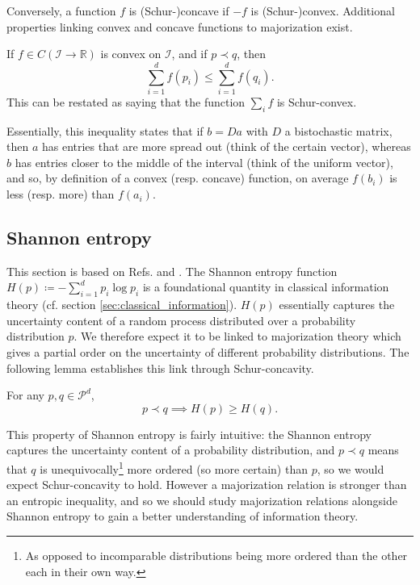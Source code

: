 Conversely, a function $f$ is (Schur-)concave if $-f$ is (Schur-)convex. Additional properties linking convex and concave functions to majorization exist.

\begin{lemma} \label{lem:karamata}
    If $f \in C(\mathcal{I} \to \mathbb{R})$ is convex on $\mathcal{I}$, and if $p \prec q$, then
    \begin{equation}
        \sum_{i=1}^{d} f(p_i) \leq \sum_{i=1}^{d} f(q_i).
    \end{equation}
    This can be restated as saying that the function $\sum_i f$ is Schur-convex.
\end{lemma}

Essentially, this inequality states that if $b = Da$ with $D$ a bistochastic matrix, then $a$ has entries that are more spread out (think of the certain vector), whereas $b$ has entries closer to the middle of the interval (think of the uniform vector), and so, by definition of a convex (resp. concave) function, on average $f(b_i)$ is less (resp. more) than $f(a_i)$.



\subsection{Shannon entropy} \label{sec:schur_shannon}

This section is based on Refs. \cite[p. 101]{marshall_inequalities_2011} and \cite[p. 88]{cover_elements_2006}. %
The Shannon entropy function $H(p) \coloneqq - \sum_{i = 1}^{d} p_i \log p_i$ is a foundational quantity in classical information theory (cf. section \ref{sec:classical_information}). $H(p)$ essentially captures the uncertainty content of a random process distributed over a probability distribution $p$. We therefore expect it to be linked to majorization theory which gives a partial order on the uncertainty of different probability distributions. The following lemma establishes this link through Schur-concavity.

\begin{lemma}
    For any $p, q \in \mathcal{P}^d$,
    \begin{equation}
        p \prec q \implies  H(p) \geq H(q).
    \end{equation}
\end{lemma}

This property of Shannon entropy is fairly intuitive: the Shannon entropy captures the uncertainty content of a probability distribution, and $p \prec q$ means that $q$ is unequivocally\footnote{As opposed to incomparable distributions being more ordered than the other each in their own way.} more ordered (so more certain) than $p$, so we would expect Schur-concavity to hold. However a majorization relation is stronger than an entropic inequality, and so we should study majorization relations alongside Shannon entropy to gain a better understanding of information theory.

